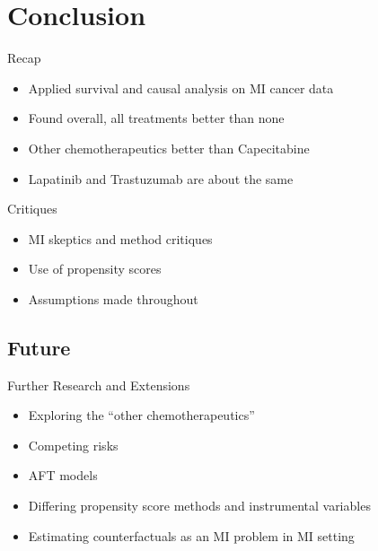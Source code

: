 \section{Conclusion}

\begin{frame}{Recap}
 \begin{itemize}
  \item Applied survival and causal analysis on MI cancer data
  \item Found overall, all treatments better than none
  \item Other chemotherapeutics better than Capecitabine
  \item Lapatinib and Trastuzumab are about the same
 \end{itemize}

\end{frame}


\begin{frame}{Critiques}
 \begin{itemize}
  \item MI skeptics and method critiques
  \item Use of propensity scores
  \item Assumptions made throughout
  \end{itemize}

\end{frame}

\subsection{Future}
\begin{frame}{Further Research and Extensions}

\begin{itemize}
 \item Exploring the ``other chemotherapeutics''
 \item Competing risks
 \item AFT models
 \item Differing propensity score methods and instrumental variables
 \item Estimating counterfactuals as an MI problem in MI setting
 
\end{itemize}

 
\end{frame}

